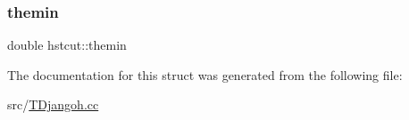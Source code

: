 \mbox{\label{structhstcut_ae620b6ff10decc27b732c1b7fd53e13a}} 
\subsubsection{\texorpdfstring{themin}{themin}}
{\footnotesize\ttfamily double hstcut\+::themin}



The documentation for this struct was generated from the following file\+:\begin{DoxyCompactItemize}
\item 
src/\hyperlink{_t_djangoh_8cc}{T\+Djangoh.\+cc}\end{DoxyCompactItemize}
